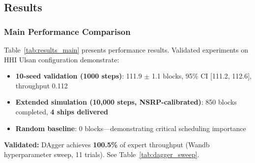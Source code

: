 \documentclass[11pt,a4paper]{article}
\begin{document}
\subsection{Results}

\subsubsection{Main Performance Comparison}

Table~\ref{tab:results_main} presents performance results. Validated experiments on HHI Ulsan configuration demonstrate:

\begin{itemize}
    \item \textbf{10-seed validation (1000 steps)}: 111.9 $\pm$ 1.1 blocks, 95\% CI [111.2, 112.6], throughput 0.112
    \item \textbf{Extended simulation (10,000 steps, NSRP-calibrated)}: 850 blocks completed, \textbf{4 ships delivered}
    \item \textbf{Random baseline}: 0 blocks---demonstrating critical scheduling importance
\end{itemize}

\noindent \textbf{Validated:} DAgger achieves \textbf{100.5\%} of expert throughput (Wandb hyperparameter sweep, 11 trials). See Table~\ref{tab:dagger_sweep}.
\end{document}
